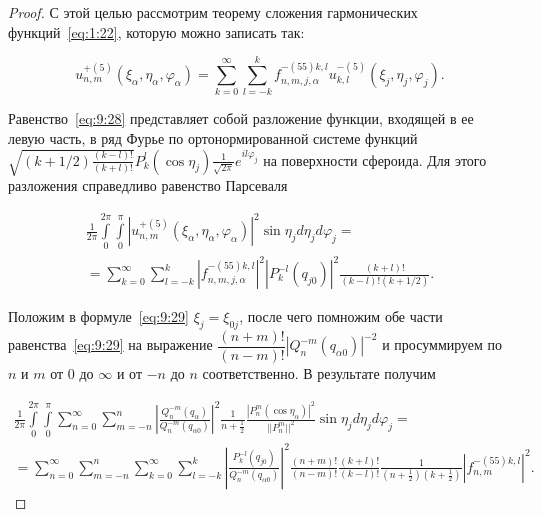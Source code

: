 \begin{proof}
С этой целью рассмотрим теорему сложения гармонических функций~\eqref{eq:1:22}, которую можно записать так:

\begin{equation}
u_{n,m}^{ + (5)}\left( {{\xi _{\alpha}},{\eta _{\alpha}},{\varphi _{\alpha}}} \right) = \sum\limits_{k = 0}^\infty\sum\limits_{l=-k}^k f_{n,m,j,\alpha}^{-(55)k,l} u_{k,l}^{ - (5)}\left( {{\xi _j},{\eta _j},{\varphi _j}} \right).
\label{eq:9:28}
\end{equation}

Равенство~\eqref{eq:9:28} представляет собой разложение функции, входящей в ее левую часть, в ряд Фурье по ортонормированной системе функций $\sqrt {(k + 1/2)\frac{{(k - l)!}}{{(k + l)!}}} P_k^l(\cos {\eta _j})\frac{1}{{\sqrt {2\pi } }}{e^{il{\varphi _j}}}$ на поверхности сфероида. Для этого разложения справедливо равенство Парсеваля\sloppy

\begin{multline}
\frac{1}{{2\pi }}\int\limits_0^{2\pi } {\int\limits_0^\pi  {{{\left| {u_{n,m}^{ + (5)}\left( {{\xi _{\alpha}},{\eta _{\alpha}},{\varphi _{\alpha}}} \right)} \right|}^2}} } \sin {\eta _j}d{\eta _j}d{\varphi _j} = \\
= \sum\limits_{k = 0}^\infty  {\sum\limits_{l =  - k}^k {{{\left| {f_{n,m,j,\alpha}^{-(55)k,l}} \right|}^2}} } {\left| {P_k^{ - l}({q_{j0}})} \right|^2}\frac{{(k + l)!}}{{(k - l)!(k + 1/2)}}.
\label{eq:9:29}
\end{multline}

Положим в формуле~\eqref{eq:9:29} $\xi_j=\xi_{0j}$, после чего помножим обе части равенства~\eqref{eq:9:29} на выражение $\dfrac{{(n + m)!}}{{(n - m)!}}{{{{\left| {Q_n^{ - m}\left( {{q _{\alpha 0}}} \right)} \right|}^{-2}}}}$ и просуммируем по $n$ и $m$ от $0$ до $\infty$ и от $-n$ до $n$ соответственно. В результате получим

\begin{multline}
\frac{1}{{2\pi }}\int\limits_0^{2\pi } {\int\limits_0^\pi  {\sum\limits_{n = 0}^\infty  {\sum\limits_{m =  - n}^n {{{\left| {\frac{{Q_n^{ - m}\left( {{q _{\alpha}}} \right)}}{{Q_n^{ - m}\left( {{q _{\alpha 0}}} \right)}}} \right|}^2}} } } } \frac{1}{{n + \frac{1}{2}}}\frac{{{{\left| {P_n^m(\cos {\eta _{\alpha}})} \right|}^2}}}{{||P_n^m|{|^2}}}\sin {\eta _j}d{\eta _j}d{\varphi _j} = \\
= \sum\limits_{n = 0}^\infty  {\sum\limits_{m =  - n}^n {\sum\limits_{k = 0}^\infty  {\sum\limits_{l =  - k}^k {{{\left| {\frac{{P_k^{ - l}({q_{j0}})}}{{Q_n^{ - m}\left( {{q _{\alpha 0}}} \right)}}} \right|}^2}} } } } \frac{{(n + m)!}}{{(n - m)!}}\frac{{(k + l)!}}{{(k - l)!}}\frac{1}{{\left( {n + \frac{1}{2}} \right)\left( {k + \frac{1}{2}} \right)}}{\left| {f_{n,m}^{-(55)k,l}} \right|^2}.
\label{eq:9:30}
\end{multline}


\end{proof}
